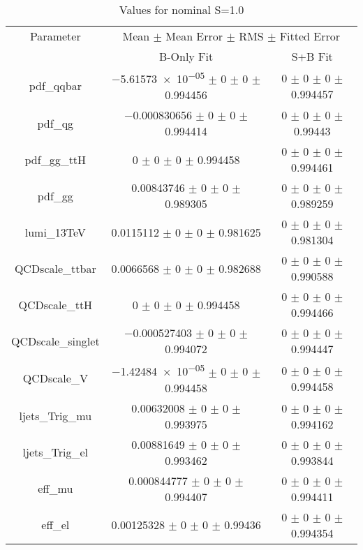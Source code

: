 \begin{table}
\centering
\caption{Values for nominal S=1.0}
\begin{tabular}{ccc}
\toprule
Parameter 	& \multicolumn{2}{c}{Mean $\pm$ Mean Error $\pm$ RMS $\pm$ Fitted Error}\\
 	& B-Only Fit & S+B Fit\\
\midrule
pdf\_qqbar 	& \num{-5.61573e-05} $\pm$ \num{0} $\pm$ \num{0} $\pm$ \num{0.994456} 	& \num{0} $\pm$ \num{0} $\pm$ \num{0} $\pm$ \num{0.994457}\\
pdf\_qg 	& \num{-0.000830656} $\pm$ \num{0} $\pm$ \num{0} $\pm$ \num{0.994414} 	& \num{0} $\pm$ \num{0} $\pm$ \num{0} $\pm$ \num{0.99443}\\
pdf\_gg\_ttH 	& \num{0} $\pm$ \num{0} $\pm$ \num{0} $\pm$ \num{0.994458} 	& \num{0} $\pm$ \num{0} $\pm$ \num{0} $\pm$ \num{0.994461}\\
pdf\_gg 	& \num{0.00843746} $\pm$ \num{0} $\pm$ \num{0} $\pm$ \num{0.989305} 	& \num{0} $\pm$ \num{0} $\pm$ \num{0} $\pm$ \num{0.989259}\\
lumi\_13TeV 	& \num{0.0115112} $\pm$ \num{0} $\pm$ \num{0} $\pm$ \num{0.981625} 	& \num{0} $\pm$ \num{0} $\pm$ \num{0} $\pm$ \num{0.981304}\\
QCDscale\_ttbar 	& \num{0.0066568} $\pm$ \num{0} $\pm$ \num{0} $\pm$ \num{0.982688} 	& \num{0} $\pm$ \num{0} $\pm$ \num{0} $\pm$ \num{0.990588}\\
QCDscale\_ttH 	& \num{0} $\pm$ \num{0} $\pm$ \num{0} $\pm$ \num{0.994458} 	& \num{0} $\pm$ \num{0} $\pm$ \num{0} $\pm$ \num{0.994466}\\
QCDscale\_singlet 	& \num{-0.000527403} $\pm$ \num{0} $\pm$ \num{0} $\pm$ \num{0.994072} 	& \num{0} $\pm$ \num{0} $\pm$ \num{0} $\pm$ \num{0.994447}\\
QCDscale\_V 	& \num{-1.42484e-05} $\pm$ \num{0} $\pm$ \num{0} $\pm$ \num{0.994458} 	& \num{0} $\pm$ \num{0} $\pm$ \num{0} $\pm$ \num{0.994458}\\
ljets\_Trig\_mu 	& \num{0.00632008} $\pm$ \num{0} $\pm$ \num{0} $\pm$ \num{0.993975} 	& \num{0} $\pm$ \num{0} $\pm$ \num{0} $\pm$ \num{0.994162}\\
ljets\_Trig\_el 	& \num{0.00881649} $\pm$ \num{0} $\pm$ \num{0} $\pm$ \num{0.993462} 	& \num{0} $\pm$ \num{0} $\pm$ \num{0} $\pm$ \num{0.993844}\\
eff\_mu 	& \num{0.000844777} $\pm$ \num{0} $\pm$ \num{0} $\pm$ \num{0.994407} 	& \num{0} $\pm$ \num{0} $\pm$ \num{0} $\pm$ \num{0.994411}\\
eff\_el 	& \num{0.00125328} $\pm$ \num{0} $\pm$ \num{0} $\pm$ \num{0.99436} 	& \num{0} $\pm$ \num{0} $\pm$ \num{0} $\pm$ \num{0.994354}\\

\end{tabular}
\end{table}
